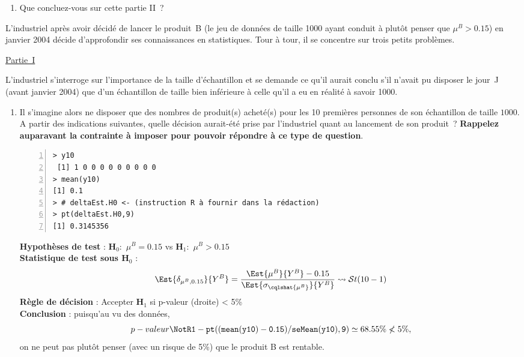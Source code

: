 \documentclass[10pt]{report}
\begin{document}
\begin{exercice}
\begin{enumerate}
\item Que concluez-vous sur cette partie II~?





\end{enumerate}

\end{exercice}

\begin{exercice}
L'industriel après avoir décidé de lancer le produit~B (le jeu de données de taille 1000 ayant conduit à plutôt penser que $\mu^B>0.15$) en janvier 2004 décide d'approfondir ses connaissances en statistiques. Tour à tour, il se concentre sur trois petits problèmes. 

\noindent \underline{Partie~I}

L'industriel s'interroge sur l'importance de la taille d'échantillon et se demande ce qu'il aurait conclu s'il n'avait pu disposer le jour~J (avant janvier 2004) que d'un échantillon de taille bien inférieure à celle qu'il a eu en réalité à savoir 1000. 

\begin{enumerate}
\item Il s'imagine alors ne disposer que des nombres de produit(s) acheté(s) pour les 10 premières personnes de son échantillon de taille $1000$.  A partir des indications suivantes, quelle décision aurait-été prise par l'industriel quant au lancement de son produit~? \textbf{Rappelez auparavant la contrainte à imposer pour pouvoir répondre à ce type de question}. 

\IndicR
\begin{Verbatim}[frame=leftline,fontfamily=tt,fontshape=n,numbers=left]
> y10
 [1] 1 0 0 0 0 0 0 0 0 0
> mean(y10)
[1] 0.1
> # deltaEst.H0 <- (instruction R à fournir dans la rédaction)
> pt(deltaEst.H0,9)
[1] 0.3145356
\end{Verbatim}

 

\begin{Correction}

\noindent \textbf{Hypothèses de test} : $\mathbf{H}_0:$ $\mu^{B}=0.15$ vs {\large $\mathbf{H}_1:$ $\mu^{B}>0.15$}\\
\textbf{Statistique de test sous $\mathbf{H}_0$} :
  $$
  \Est{\delta_{\mu^{B},0.15}}{Y^{B}}= {\displaystyle \frac{\Est{\mu^{B}}{Y^{B}}-0.15}{
\Est{\sigma_{\cqlshat{\mu^{B}}}}{Y^{B}}
}} 
  \leadsto \mathcal{S}t(10-1)
  $$
\textbf{Règle de décision} : Accepter $\mathbf{H}_1$ si 
  p-valeur (droite) < 5\%\\
\noindent \textbf{Conclusion} :
puisqu'au vu des données, 
  \[
p-valeur\NotR\mathtt{1-pt((mean(y10)-0.15)/seMean(y10),9)} \simeq 68.55\%\nless5\%,
\]
on ne peut pas plutôt penser (avec un risque de 5\%) que le produit B est rentable.
\end{Correction}





\end{enumerate}
\end{exercice}
\end{document}
